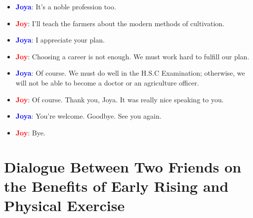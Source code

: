 \documentclass{article}
\begin{document}
\begin{itemize}
    \item \textbf{\textcolor{blue}{Joya}}: It’s a noble profession too.
    \item \textbf{\textcolor{red}{Joy}}: I’ll teach the farmers about the modern methods of cultivation.
    \item \textbf{\textcolor{blue}{Joya}}: I appreciate your plan.
    \item \textbf{\textcolor{red}{Joy}}: Choosing a career is not enough. We must work hard to fulfill our plan.
    \item \textbf{\textcolor{blue}{Joya}}: Of course. We must do well in the H.S.C Examination; otherwise, we will not be able to become a doctor or an agriculture officer.
    \item \textbf{\textcolor{red}{Joy}}: Of course. Thank you, Joya. It was really nice speaking to you.
    \item \textbf{\textcolor{blue}{Joya}}: You’re welcome. Goodbye. See you again.
    \item \textbf{\textcolor{red}{Joy}}: Bye.
\end{itemize}
\section*{Dialogue Between Two Friends on the Benefits of Early Rising and Physical Exercise}
\end{document}
